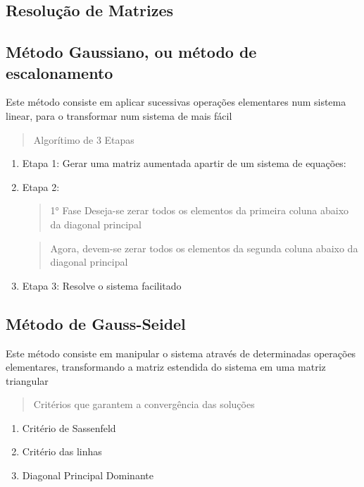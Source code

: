 \documentclass{article}
\begin{document}
\begin{multicols}{2}
\section{Resolução de Matrizes}
        \subsection{Método Gaussiano, ou método de \\escalonamento}
        Este método consiste em aplicar sucessivas operações elementares num sistema linear, para o transformar num sistema de mais fácil
        
        \begin{quote}
            Algorítimo de 3 Etapas
        \end{quote}
        \begin{enumerate}
            \item Etapa 1: Gerar uma matriz aumentada apartir de um sistema de equações:
            \item Etapa 2: 
            \begin{quote}
                1° Fase Deseja-se zerar todos os elementos da primeira coluna abaixo da diagonal principal
            \end{quote}
            \begin{quote}
                Agora, devem-se zerar todos os elementos da segunda coluna abaixo da diagonal principal
            \end{quote}
            \item Etapa 3: Resolve o sistema facilitado
        \end{enumerate}
        
        \subsection{Método de Gauss-Seidel}
        Este método consiste em manipular o sistema através de determinadas operações elementares, transformando a matriz estendida do sistema em uma matriz triangular

        \begin{quote}
            Critérios que garantem a convergência das soluções
        \end{quote}
        \begin{enumerate}
            \item Critério de Sassenfeld
            \item Critério das linhas
            \item Diagonal Principal Dominante
        \end{enumerate}


\end{multicols}
\end{document}
